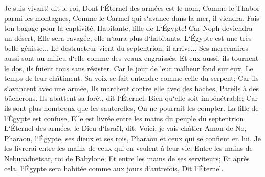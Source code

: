\verse Je suis vivant! dit le roi, Dont l`Éternel des armées est le nom, Comme le Thabor parmi les montagnes, Comme le Carmel qui s`avance dans la mer, il viendra. 
\verse Fais ton bagage pour la captivité, Habitante, fille de L`Égypte! Car Noph deviendra un désert, Elle sera ravagée, elle n`aura plus d`habitants. 
\verse L`Égypte est une très belle génisse... Le destructeur vient du septentrion, il arrive... 
\verse Ses mercenaires aussi sont au milieu d`elle comme des veaux engraissés. Et eux aussi, ils tournent le dos, ils fuient tous sans résister. Car le jour de leur malheur fond sur eux, Le temps de leur châtiment. 
\verse Sa voix se fait entendre comme celle du serpent; Car ils s`avancent avec une armée, Ils marchent contre elle avec des haches, Pareils à des bûcherons. 
\verse Ils abattent sa forêt, dit l`Éternel, Bien qu`elle soit impénétrable; Car ils sont plus nombreux que les sauterelles, On ne pourrait les compter. 
\verse La fille de l`Égypte est confuse, Elle est livrée entre les mains du peuple du septentrion. 
\verse L`Éternel des armées, le Dieu d`Israël, dit: Voici, je vais châtier Amon de No, Pharaon, l`Égypte, ses dieux et ses rois, Pharaon et ceux qui se confient en lui. 
\verse Je les livrerai entre les mains de ceux qui en veulent à leur vie, Entre les mains de Nebucadnetsar, roi de Babylone, Et entre les mains de ses serviteurs; Et après cela, l`Égypte sera habitée comme aux jours d`autrefois, Dit l`Éternel. 
